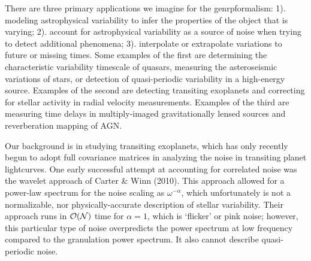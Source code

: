 \documentclass[manuscript, letterpaper]{aastex6}
\newcommand{\project}[1]{\textsf{#1}}
\newcommand{\genrp}{\project{genrp}}
\begin{document}
There are three primary applications we imagine for the \genrp formalism: 1). modeling
astrophysical variability to infer the properties of the object that is varying; 2).
account for astrophysical variability as a source of noise when trying to detect 
additional phenomena; 3). interpolate or extrapolate variations to future or missing
times.  Some examples of the first are determining the characteristic
variability timescale of quasars, measuring the asteroseismic variations of stars,
or detection of quasi-periodic variability in a high-energy source.  Examples of the
second are detecting transiting exoplanets and correcting for stellar activity in
radial velocity measurements. Examples of the third are measuring time delays in 
multiply-imaged gravitationally lensed sources and reverberation mapping of AGN.

Our background is in studying transiting exoplanets, which has only recently begun
to adopt full covariance matrices in analyzing the noise in transiting planet lightcurves.
One early successful attempt at accounting for correlated noise was the wavelet approach
of Carter \& Winn (2010).  This approach allowed for a power-law spectrum for the
noise scaling as $\omega^{-\alpha}$, which unfortunately is not a normalizable, nor
physically-accurate description of stellar variability.  Their approach runs in
$\cal{O}(N)$ time for $\alpha=1$, which is `flicker' or pink noise;  however, this
particular type of noise overpredicts the power spectrum at low frequency compared
to the granulation power spectrum.  It also cannot describe quasi-periodic noise.
\end{document}
